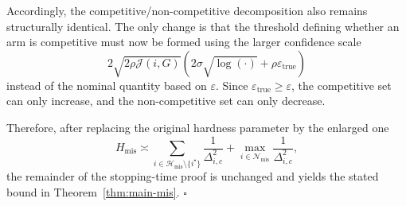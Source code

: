 \documentclass{article}
\begin{document}
Accordingly, the competitive/non-competitive decomposition also remains
structurally identical. The only change is that the threshold defining whether
an arm is competitive must now be formed using the larger confidence scale
\[
2\sqrt{2\rho\mathcal J(i,G)}
\left(
2\sigma\sqrt{\log(\cdot)}+\rho\varepsilon_{\mathrm{true}}
\right)
\]
instead of the nominal quantity based on $\varepsilon$. Since
$\varepsilon_{\mathrm{true}}\ge \varepsilon$, the competitive set can only
increase, and the non-competitive set can only decrease.

Therefore, after replacing the original hardness parameter by the enlarged one
\[
H_{\mathrm{mis}}
\asymp
\sum_{i\in \mathcal H_{\mathrm{mis}}\setminus\{i^\star\}}
\frac{1}{\Delta_{i,c}^2}
+
\max_{i\in \mathcal N_{\mathrm{mis}}}
\frac{1}{\Delta_{i,c}^2},
\]
the remainder of the stopping-time proof is unchanged and yields the stated
bound in Theorem~\ref{thm:main-mis}. \hfill$\square$
\end{document}
